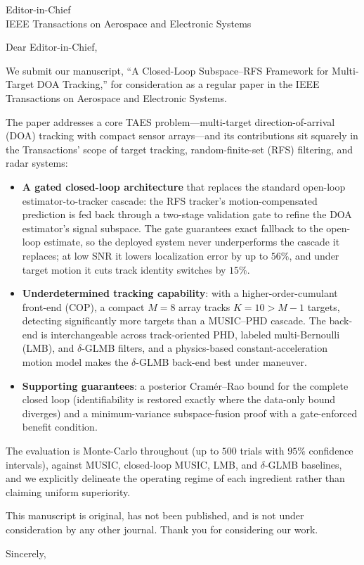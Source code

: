 \documentclass[11pt]{letter}
\begin{document}
\begin{letter}{Editor-in-Chief \\ IEEE Transactions on Aerospace and Electronic Systems}
\opening{Dear Editor-in-Chief,}

We submit our manuscript, ``A Closed-Loop Subspace--RFS Framework for
Multi-Target DOA Tracking,'' for consideration as a regular paper in the IEEE
Transactions on Aerospace and Electronic Systems.

The paper addresses a core TAES problem---multi-target direction-of-arrival
(DOA) tracking with compact sensor arrays---and its contributions sit squarely
in the Transactions' scope of target tracking, random-finite-set (RFS)
filtering, and radar systems:

\begin{itemize}
\item \textbf{A gated closed-loop architecture} that replaces the standard
  open-loop estimator-to-tracker cascade: the RFS tracker's motion-compensated
  prediction is fed back through a two-stage validation gate to refine the DOA
  estimator's signal subspace. The gate guarantees exact fallback to the
  open-loop estimate, so the deployed system never underperforms the cascade it
  replaces; at low SNR it lowers localization error by up to $56\%$, and under
  target motion it cuts track identity switches by $15\%$.
\item \textbf{Underdetermined tracking capability}: with a higher-order-cumulant
  front-end (COP), a compact $M{=}8$ array tracks $K{=}10>M{-}1$ targets,
  detecting significantly more targets than a MUSIC--PHD cascade. The back-end
  is interchangeable across track-oriented PHD, labeled multi-Bernoulli (LMB),
  and $\delta$-GLMB filters, and a physics-based constant-acceleration motion
  model makes the $\delta$-GLMB back-end best under maneuver.
\item \textbf{Supporting guarantees}: a posterior Cram\'er--Rao bound for the
  complete closed loop (identifiability is restored exactly where the data-only
  bound diverges) and a minimum-variance subspace-fusion proof with a
  gate-enforced benefit condition.
\end{itemize}

The evaluation is Monte-Carlo throughout (up to $500$ trials with $95\%$
confidence intervals), against MUSIC, closed-loop MUSIC, LMB, and $\delta$-GLMB
baselines, and we explicitly delineate the operating regime of each ingredient
rather than claiming uniform superiority.

This manuscript is original, has not been published, and is not under
consideration by any other journal. Thank you for considering our work.

\closing{Sincerely,}
\end{letter}
\end{document}
